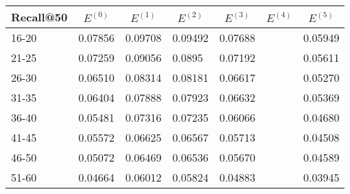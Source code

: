 \begin{table*}[]
    \centering
    \begin{tabular}{|l|l|l|l|l|l|l|}
        \hline
        Recall@50 & \multicolumn{1}{c|}{$E^{(0)}$} & \multicolumn{1}{c|}{$E^{(1)}$} & \multicolumn{1}{c|}{$E^{(2)}$} & \multicolumn{1}{c|}{$E^{(3)}$} & \multicolumn{1}{c|}{$E^{(4)}$} & \multicolumn{1}{c|}{$E^{(5)}$} \\ \hline
        16-20     & 0.07856                        & 0.09708                        & 0.09492                        & 0.07688                        &                                & 0.05949                               \\ \hline
        21-25     & 0.07259                        & 0.09056                        & 0.0895                         & 0.07192                        &                                & 0.05611                               \\ \hline
        26-30     & 0.06510                        & 0.08314                        & 0.08181                        & 0.06617                        &                                & 0.05270                               \\ \hline
        31-35     & 0.06404                        & 0.07888                        & 0.07923                        & 0.06632                        &                                & 0.05369                               \\ \hline
        36-40     & 0.05481                        & 0.07316                        & 0.07235                        & 0.06066                        &                                & 0.04680                               \\ \hline
        41-45     & 0.05572                        & 0.06625                        & 0.06567                        & 0.05713                        &                                & 0.04508                               \\ \hline
        46-50     & 0.05072                        & 0.06469                        & 0.06536                        & 0.05670                        &                                & 0.04589                               \\ \hline
        51-60     & 0.04664                        & 0.06012                        & 0.05824                        & 0.04883                        &                                & 0.03945                               \\ \hline

\end{tabular}
\end{table*}
